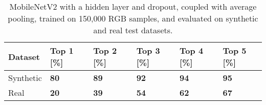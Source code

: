 \begin{table}[!h]
    \centering
    \caption[Top-N accuracies for MobileNetV2 on real and synthetic test
    datasets]{MobileNetV2 with a hidden layer and dropout, coupled with average
        pooling, trained on 150,000 RGB samples, and evaluated on synthetic and
        real test datasets.}
    \begin{tabular}{llllll}
        \toprule
		Dataset & Top 1 [\%] & Top 2 [\%] & Top 3 [\%] & Top 4 [\%] & Top 5 [\%]\\
        \midrule         
        Synthetic & \textbf{80} & \textbf{89} & \textbf{92} & \textbf{94} &
        \textbf{95} \\ 
        Real & \textbf{20} & \textbf{39} & \textbf{54} & \textbf{62} &
        \textbf{67} \\
        \bottomrule
    \end{tabular}
    \label{table:mobilenetv2-noaug}
\end{table}
